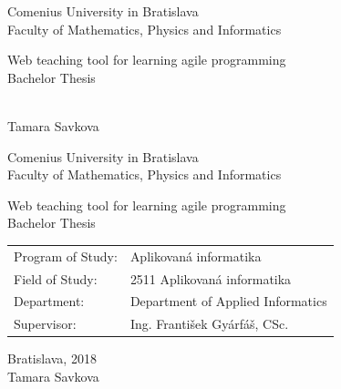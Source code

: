 \documentclass[12pt, oneside]{book}  %
\def\mfrok{2018}
\def\mfnazov{Web teaching tool for learning agile programming}
\def\mftyp{Bachelor Thesis}
\def\mfautor{Tamara Savkova}
\def\mfskolitel{Ing. František Gyárfáš, CSc.}
\def\mfmiesto{Bratislava, \mfrok}
\def\mfodbor{ 2511 Aplikovaná informatika }
\def\program{ Aplikovaná informatika }
\def\mfpracovisko{ Department of Applied Informatics }
\begin{document}
     
\frontmatter


\thispagestyle{empty}

\begin{center}
\sc\large
Comenius University in Bratislava\\
Faculty of Mathematics, Physics and Informatics

\vfill

{\LARGE\mfnazov}\\
\mftyp
\end{center}

\vfill

{\sc\large 
\noindent \mfrok\\
\mfautor
}

\cleardoublepage


\thispagestyle{empty}
\noindent

\begin{center}
\sc  
\large
Comenius University in Bratislava\\
Faculty of Mathematics, Physics and Informatics

\vfill

{\LARGE\mfnazov}\\
\mftyp
\end{center}

\vfill

\noindent
\begin{tabular}{ll}
Program of Study: & \program \\
Field of Study: & \mfodbor \\
Department: & \mfpracovisko \\
Supervisor: & \mfskolitel \\
\end{tabular}

\vfill


\noindent \mfmiesto\\
\mfautor

\cleardoublepage


\end{document}
